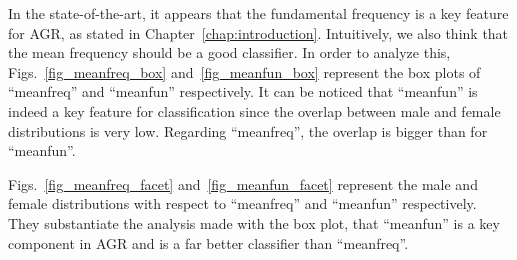 In the state-of-the-art, it appears that the fundamental frequency is a key feature for AGR, as stated in Chapter~\ref{chap:introduction}. Intuitively, we also think that the mean frequency should be a good classifier. In order to analyze this, Figs.~\ref{fig_meanfreq_box} and~\ref{fig_meanfun_box} represent the box plots of ``meanfreq'' and ``meanfun'' respectively. 
It can be noticed that ``meanfun'' is indeed a key feature for classification since the overlap between male and female distributions is very low. Regarding ``meanfreq'', the overlap is bigger than for ``meanfun''. 

Figs.~\ref{fig_meanfreq_facet} and~\ref{fig_meanfun_facet} represent the male and female distributions with respect to ``meanfreq'' and ``meanfun'' respectively. They substantiate the analysis made with the box plot, \ie{} that ``meanfun'' is a key component in AGR and is a far better classifier than ``meanfreq''.

